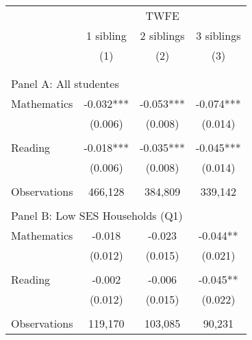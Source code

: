 \makeatletter
{}
{
\makeatother
\begin{tabular}{lccc}
\toprule
\cmidrule(lr){2-4}
& \multicolumn{3}{c}{TWFE} \\
\cmidrule(lr){2-4}
& 1 sibling & 2 siblings & 3 siblings  \\
\cmidrule(lr){2-2} \cmidrule(lr){3-3} \cmidrule(lr){4-4}
& (1) & (2) & (3)\\
\bottomrule
&  &  &  \\
&  &  &   \\
\multicolumn{4}{l}{Panel A: All studentes } \\
\hspace{3mm}Mathematics&      -0.032***&      -0.053***&      -0.074***\\
                    &     (0.006)   &     (0.008)   &     (0.014)   \\
 
&  &  &   \\
\hspace{3mm}Reading &      -0.018***&      -0.035***&      -0.045***\\
                    &     (0.006)   &     (0.008)   &     (0.014)   \\
                    &               &               &               \\
\hspace{3mm}Observations&     466,128   &     384,809   &     339,142   \\
 
&  &  &   \\
\multicolumn{4}{l}{Panel B: Low SES Households (Q1)} \\
\hspace{3mm}Mathematics&      -0.018   &      -0.023   &      -0.044** \\
                    &     (0.012)   &     (0.015)   &     (0.021)   \\
 
&  &  &   \\
\hspace{3mm}Reading &      -0.002   &      -0.006   &      -0.045** \\
                    &     (0.012)   &     (0.015)   &     (0.022)   \\
                    &               &               &               \\
\hspace{3mm}Observations&     119,170   &     103,085   &      90,231   \\
 

\end{tabular}}
